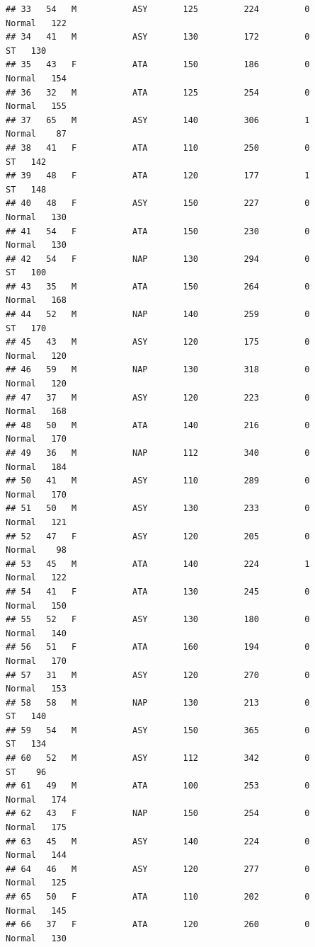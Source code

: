 \documentclass[
]{article}
\begin{document}
\begin{verbatim}
## 33   54   M           ASY       125         224         0     Normal   122
## 34   41   M           ASY       130         172         0         ST   130
## 35   43   F           ATA       150         186         0     Normal   154
## 36   32   M           ATA       125         254         0     Normal   155
## 37   65   M           ASY       140         306         1     Normal    87
## 38   41   F           ATA       110         250         0         ST   142
## 39   48   F           ATA       120         177         1         ST   148
## 40   48   F           ASY       150         227         0     Normal   130
## 41   54   F           ATA       150         230         0     Normal   130
## 42   54   F           NAP       130         294         0         ST   100
## 43   35   M           ATA       150         264         0     Normal   168
## 44   52   M           NAP       140         259         0         ST   170
## 45   43   M           ASY       120         175         0     Normal   120
## 46   59   M           NAP       130         318         0     Normal   120
## 47   37   M           ASY       120         223         0     Normal   168
## 48   50   M           ATA       140         216         0     Normal   170
## 49   36   M           NAP       112         340         0     Normal   184
## 50   41   M           ASY       110         289         0     Normal   170
## 51   50   M           ASY       130         233         0     Normal   121
## 52   47   F           ASY       120         205         0     Normal    98
## 53   45   M           ATA       140         224         1     Normal   122
## 54   41   F           ATA       130         245         0     Normal   150
## 55   52   F           ASY       130         180         0     Normal   140
## 56   51   F           ATA       160         194         0     Normal   170
## 57   31   M           ASY       120         270         0     Normal   153
## 58   58   M           NAP       130         213         0         ST   140
## 59   54   M           ASY       150         365         0         ST   134
## 60   52   M           ASY       112         342         0         ST    96
## 61   49   M           ATA       100         253         0     Normal   174
## 62   43   F           NAP       150         254         0     Normal   175
## 63   45   M           ASY       140         224         0     Normal   144
## 64   46   M           ASY       120         277         0     Normal   125
## 65   50   F           ATA       110         202         0     Normal   145
## 66   37   F           ATA       120         260         0     Normal   130

\end{verbatim}
\end{document}

